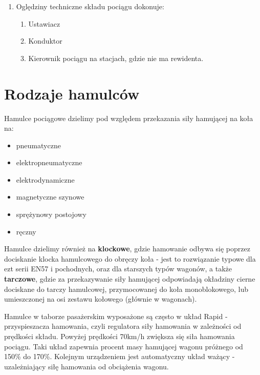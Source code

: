 \begin{tcolorbox}[colback=black!5!white,colframe=green!75!black,width=18cm,title=Podsumowanie rozdziału]
	\begin{enumerate}
		\item Oględziny techniczne składu pociągu dokonuje:
		\begin{enumerate}
			\item Ustawiacz
			\item Konduktor
			\item Kierownik pociągu na stacjach, gdzie nie ma rewidenta.
		\end{enumerate} 
	\end{enumerate}
\end{tcolorbox}

\chapter{Rodzaje hamulców}

Hamulce pociągowe dzielimy pod względem przekazania siły hamującej na koła na:

\begin{itemize}
	\item pneumatyczne
	\item elektropneumatyczne
	\item elektrodynamiczne
	\item magnetyczne szynowe
	\item sprężynowy postojowy
	\item ręczny 
\end{itemize}
Hamulce dzielimy również na \textbf{klockowe}, gdzie hamowanie odbywa się poprzez dociskanie klocka hamulcowego do obręczy koła - jest to rozwiązanie typowe dla ezt serii EN57 i pochodnych, oraz dla starszych typów wagonów, a także \textbf{tarczowe}, gdzie za przekazywanie siły hamującej odpowiadają okładziny cierne dociskane do tarczy hamulcowej, przymocowanej do koła monoblokowego, lub umieszczonej na osi zestawu kołowego (głównie w wagonach).

Hamulce w taborze pasażerskim wyposażone są często w układ Rapid - przyspieszacza hamowania, czyli regulatora siły hamowania w zależności od prędkości składu. Powyżej prędkości 70km/h zwiększa się siła hamowania pociągu. Taki układ zapewnia procent masy hamującej wagonu próżnego od 150\% do 170\%. Kolejnym urządzeniem jest automatyczny układ ważący - uzależniający siłę hamowania od obciążenia wagonu.


